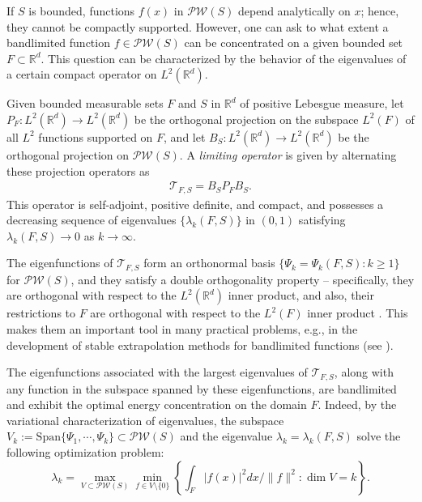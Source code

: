 \documentclass[conference]{IEEEtran}
\def\R{\mathbb{R}}
\numberwithin{equation}{section}
\newcommand{\cT}{\mathcal T}
\def\R{\mathbb{R}}
\begin{document}
If $S$ is bounded, functions $f(x)$ in $\mathcal{PW}(S)$ depend analytically on $x$; hence, they cannot be compactly supported.  However, one can ask to what extent a bandlimited function $f\in  \mathcal{PW}(S)$ can be concentrated on a given bounded set $F \subset \R^d$. This question can be characterized by the behavior of the eigenvalues of a certain compact operator on $L^2(\R^d)$.

Given bounded measurable sets $F$ and $S$ in $\R^d$ of positive Lebesgue measure, let $P_F: L^2(\R^d) \rightarrow L^2(\R^d) $ be the orthogonal projection on the subspace $L^2(F)$ of all $L^2$ functions supported on $F$, and let $B_S: L^2(\R^d) \rightarrow L^2(\R^d)$ be the orthogonal projection on %
$\mathcal{PW}(S)$. A \emph{limiting operator} is  given by alternating these projection operators as 
\begin{align}\label{SSLO}
\cT_{F,S} = B_S P_F B_S.
\end{align}
This operator is self-adjoint, positive definite,  and compact, and possesses a decreasing 
 sequence of eigenvalues $\{\lambda_k(F,S)\}$ in $(0,1)$  
satisfying $\lambda_k(F,S)\to 0$ as $k\to \infty$. 

The eigenfunctions of $\mathcal{T}_{F,S}$ form an orthonormal basis $\{\Psi_k = \Psi_k(F,S) : k \geq 1\}$ for \( \mathcal{PW}(S) \), and they satisfy a double orthogonality property -- specifically, they are orthogonal with respect to the \( L^2(\mathbb{R}^d) \) inner product, and also, their restrictions to $F$ are orthogonal with respect to the $L^2(F)$ inner product \cite{Bell4}. This makes them an important tool in many practical problems, e.g., in the development of stable extrapolation methods for bandlimited functions (see \cite{landau1985overview}).

The eigenfunctions associated with the largest eigenvalues of $\mathcal{T}_{F,S}$, along with any function in the subspace spanned by these eigenfunctions, are bandlimited and exhibit the optimal energy concentration on the domain \( F \). Indeed, by the variational characterization of eigenvalues, the subspace $V_k := \mathrm{Span}\{\Psi_1,\cdots,\Psi_k\} \subset \mathcal{PW}(S)$ and the eigenvalue $\lambda_k = \lambda_k(F,S)$ solve the following optimization problem:
%
$$ \lambda_k = \max_{V \subset \mathcal{PW}(S)} \min_{f \in V \setminus \{0\}} \left\{ \int_F |f(x)|^2 dx/\|f\|^2    :  \dim V = k \right\}.
$$
\end{document}
